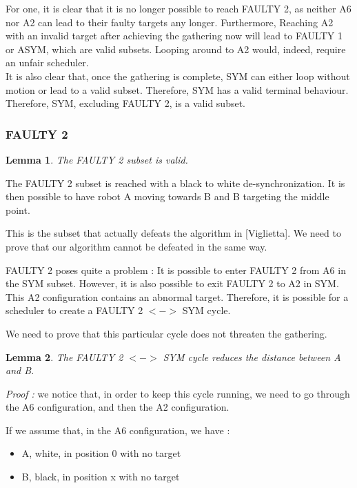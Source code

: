 \documentclass[11pt]{article}
\newtheorem{Lemma}{Lemma}
\begin{document}
For one, it is clear that it is no longer possible to reach FAULTY 2, as neither A6 nor A2 can lead to their faulty targets any longer. Furthermore, Reaching A2 with an invalid target after achieving the gathering now will lead to FAULTY 1 or ASYM, which are valid subsets. Looping around to A2 would, indeed, require an unfair scheduler.
\\
It is also clear that, once the gathering is complete, SYM can either loop without motion or lead to a valid subset. Therefore, SYM has a valid terminal behaviour.
\\
Therefore, SYM, excluding FAULTY 2, is a valid subset.

\subsubsection{FAULTY 2}

\begin{Lemma}
The FAULTY 2 subset is valid.
\end{Lemma}

The FAULTY 2 subset is reached with a black to white de-synchronization.
It is then possible to have robot A moving towards B and B targeting the middle point.

This is the subset that actually defeats the algorithm in [Viglietta]. We need to prove that our algorithm cannot be defeated in the same way.

FAULTY 2 poses quite a problem : It is possible to enter FAULTY 2 from A6 in the SYM subset. However, it is also possible to exit FAULTY 2 to A2 in SYM. This A2 configuration contains an abnormal target. Therefore, it is possible for a scheduler to create a FAULTY 2 $<->$ SYM cycle.

We need to prove that this particular cycle does not threaten the gathering. 

\begin{Lemma}
The FAULTY 2 $<->$ SYM cycle reduces the distance between A and B.
\end{Lemma}


\textit{Proof :} we notice that, in order to keep this cycle running, we need to go through the A6 configuration, and then the A2 configuration.

If we assume that, in the A6 configuration, we have :
\begin{itemize}
\item A, white, in position 0 with no target
\item B, black, in position x with no target

\end{itemize}
\end{document}
